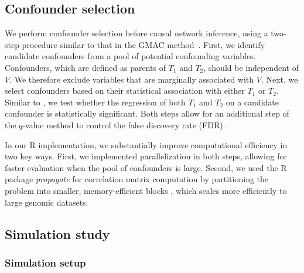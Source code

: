 \documentclass[12pt,letterpaper]{report}
\begin{document}
\begin{doublespace}
\subsection{Confounder selection}
We perform confounder selection before causal network inference, using a two-step procedure similar to that in the GMAC method~\cite{yang2017identifying}. First, we identify candidate confounders from a pool of potential confounding variables.  Confounders, which are defined as parents of $T_1$ and $T_2$, should be independent of $V$.  We therefore exclude variables that are marginally associated with $V$. 
Next, we select confounders based on their statistical association with either $T_1$ or $T_2$. Similar to \cite{yang2017identifying}, we test whether the regression of both $T_1$ and $T_2$ on a candidate confounder is statistically significant.  Both steps allow for an additional step of the $q$-value method to control the false discovery rate (FDR) \cite{storey2003positive}.

In our R implementation, we substantially improve computational efficiency in two key ways. First, we implemented parallelization in both steps, allowing for faster evaluation when the pool of confounders is large. Second, we used the R package \textit{propagate} for correlation matrix computation by partitioning the problem into smaller, memory-efficient blocks \cite{spiess2018package}, which scales more efficiently to large genomic datasets.


\subsection{Simulation study}
\subsubsection{Simulation setup}


\end{doublespace}
\end{document}
